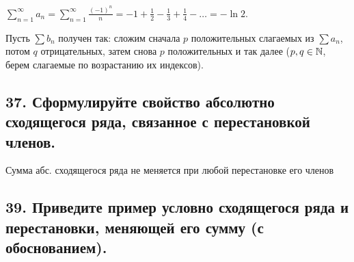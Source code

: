 \documentclass[a4paper, fleqn]{article}
\begin{document}
    $\displaystyle \sum_{n = 1}^{\infty} a_n = \sum_{n = 1}^{\infty} \frac{(-1)^n}{n} = -1 + \frac{1}{2} - \frac{1}{3} + \frac{1}{4} - \dots = -\ln 2.$
    
    Пусть $\sum b_n$ получен так: сложим сначала $p$ положительных слагаемых из $\sum a_n$, потом $q$ отрицательных, затем снова $p$ положительных и так далее ($p, q \in \mathbb{N}$, берем слагаемые по возрастанию их индексов).
    
    \subsection*{37. Сформулируйте свойство абсолютно сходящегося ряда, связанное с перестановкой членов.}
    \begin{proposition}
        Сумма абс. сходящегося ряда не меняется при любой перестановке его членов
    \end{proposition}
        
        
    \subsection*{39. Приведите пример условно сходящегося ряда и перестановки, меняющей его сумму
    (с обоснованием).}
\end{document}
